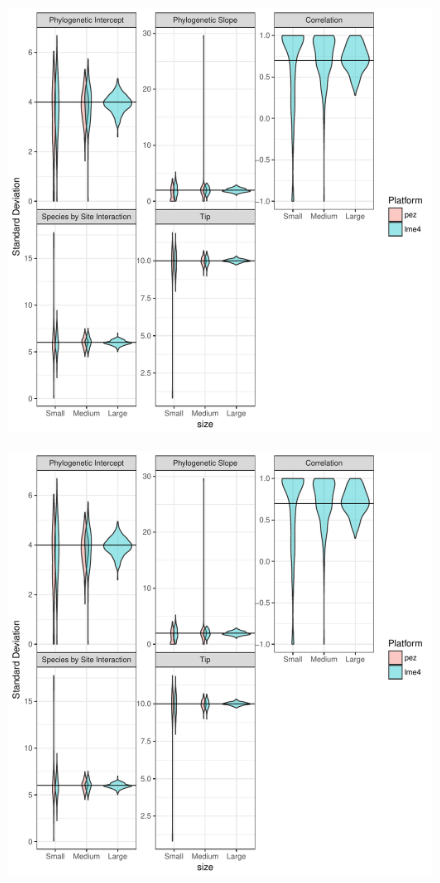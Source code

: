 \begin{center}
\begin{figure}[h]
  \includegraphics[scale=0.8,page=1]{./csplot.pdf}
  \caption{}
\end{figure}
\end{center}

\begin{center}
\begin{figure}[h]
\includegraphics[scale=0.8,page=2]{./csplot.pdf}
\caption{}
\end{figure}
\end{center}

